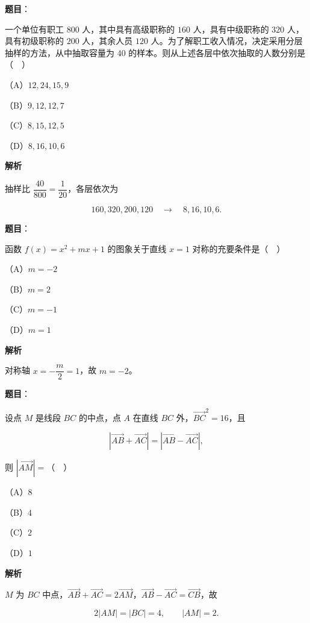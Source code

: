 \begin{answer}

\textbf{题目}：

一个单位有职工 $800$ 人，其中具有高级职称的 $160$ 人，具有中级职称的 $320$ 人，具有初级职称的 $200$ 人，其余人员 $120$ 人。为了解职工收入情况，决定采用分层抽样的方法，从中抽取容量为 $40$ 的样本。则从上述各层中依次抽取的人数分别是（　）

（A）$12,24,15,9$

（B）$9,12,12,7$

（C）$8,15,12,5$

（D）$8,16,10,6$

\textbf{解析}

抽样比 $\dfrac{40}{800}=\dfrac1{20}$，各层依次为

\nopagebreak[4]
\[160,320,200,120\quad\longrightarrow\quad 8,16,10,6.\]


\end{answer}
\begin{answer}

\textbf{题目}：

函数 $f(x)=x^2+mx+1$ 的图象关于直线 $x=1$ 对称的充要条件是（　）

（A）$m=-2$

（B）$m=2$

（C）$m=-1$

（D）$m=1$

\textbf{解析}

对称轴 $x=-\dfrac m2=1$，故 $m=-2$。


\end{answer}
\begin{answer}

\textbf{题目}：

设点 $M$ 是线段 $BC$ 的中点，点 $A$ 在直线 $BC$ 外，$\overrightarrow{BC}^2=16$，且

\nopagebreak[4]
\[\left|\overrightarrow{AB}+\overrightarrow{AC}\right|=\left|\overrightarrow{AB}-\overrightarrow{AC}\right|,\]

则 $|\overrightarrow{AM}|=$（　）

（A）$8$

（B）$4$

（C）$2$

（D）$1$

\textbf{解析}

$M$ 为 $BC$ 中点，$\overrightarrow{AB}+\overrightarrow{AC}=2\overrightarrow{AM}$，$\overrightarrow{AB}-\overrightarrow{AC}=\overrightarrow{CB}$，故

\nopagebreak[4]
\[2|AM|=|BC|=4,\qquad |AM|=2.\]


\end{answer}
